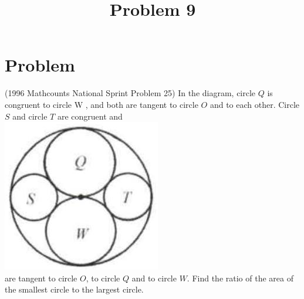 \documentclass{article}
\title{Problem 9}
\date{}
\begin{document}
\maketitle

\section*{Problem}
(1996 Mathcounts National Sprint Problem 25) In the diagram, circle \(Q\) is congruent to circle W , and both are tangent to circle \(O\) and to each other. Circle \(S\) and circle \(T\) are congruent and\\
\centering
\includegraphics[width=\textwidth]{images/problem_image_1.jpg}\\
are tangent to circle \(O\), to circle \(Q\) and to circle \(W\). Find the ratio of the area of the smallest circle to the largest circle.
\end{document}
